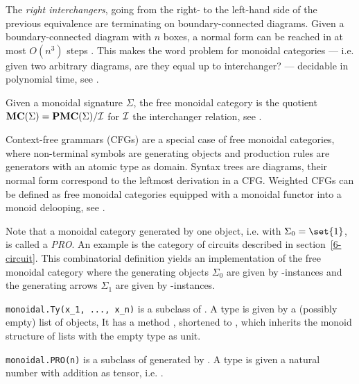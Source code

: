 \begin{center}

\end{center}

The \emph{right interchangers}, going from the right- to the left-hand side of the previous equivalence are terminating on boundary-connected diagrams.
Given a boundary-connected diagram with $n$ boxes, a normal form can be reached in at most $O(n^3)$ steps \cite[Theorem~36]{DelpeuchVicary18}.
This makes the word problem for monoidal categories --- i.e. given two arbitrary diagrams, are they equal up to interchanger? --- decidable in polynomial time, see \cite[Theorem~48]{DelpeuchVicary18}.

\begin{proposition}
Given a monoidal signature $\Sigma$, the free monoidal category is the quotient $\mathbf{MC}(\Sigma) = \mathbf{PMC}(\Sigma) / \cal{I}$ for $\cal{I}$ the interchanger relation, see \cite[Theorem~16]{DelpeuchVicary18}.
\end{proposition}

\begin{example}
Context-free grammars (CFGs) are a special case of free monoidal categories, where
non-terminal symbols are generating objects and production rules are generators
with an atomic type as domain. Syntax trees are diagrams, their normal form
correspond to the leftmost derivation in a CFG. Weighted CFGs can be defined
as free monoidal categories equipped with a monoidal functor into a monoid delooping, see \cite{ShieblerEtAl20}.
\end{example}

Note that a monoidal category generated by one object, i.e. with
$\Sigma_0 = \set{1}$, is called a \emph{PRO}. An example is the category of
circuits described in section~\ref{6-circuit}.
This combinatorial definition yields an implementation of the free monoidal category where the generating objects $\Sigma_0$ are given by -instances and the generating arrows $\Sigma_1$ are given by -instances.

\begin{class}\normalfont\texttt{monoidal.Ty(x\_1, ..., x\_n)} is a subclass of .
A type  is given by a (possibly empty) list of objects,
It has a method , shortened to , which inherits the monoid structure of lists with the empty type  as unit.
\end{class}

\begin{class}\normalfont\texttt{monoidal.PRO(n)} is a subclass of  generated by .
A  type is given a natural number  with addition as tensor, i.e.
.
\end{class}

